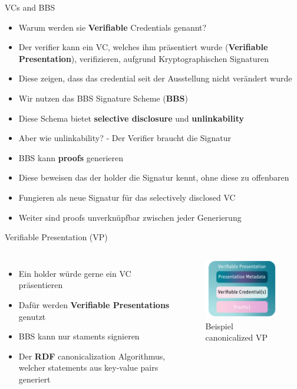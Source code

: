 \documentclass[
	ngerman,%
	authorontitle=true,
	]{bfhbeamer}
\begin{document}
\begin{frame}{VCs and BBS}
    \begin{itemize}
        \item Warum werden sie \textbf{Verifiable} Credentials genannt?
        \item Der verifier kann ein VC, welches ihm präsentiert wurde (\textbf{Verifiable Presentation}), verifizieren, aufgrund Kryptographischen Signaturen
        \item Diese zeigen, dass das credential seit der Ausstellung nicht verändert wurde
        \item Wir nutzen das BBS Signature Scheme (\textbf{BBS}) 
        \item Diese Schema bietet \textbf{selective disclosure} und \textbf{unlinkability}
        \item Aber wie unlinkability? - Der Verifier braucht die Signatur
        \item BBS kann \textbf{proofs} generieren
        \item Diese beweisen das der holder die Signatur kennt, ohne diese zu offenbaren
        \item Fungieren als neue Signatur für das selectively disclosed VC
        \item Weiter sind proofs unverknüpfbar zwischen jeder Generierung
    \end{itemize}
\end{frame}

\begin{frame}{Verifiable Presentation (VP)}
    \begin{columns}[onlytextwidth,T]
        \column{70mm}  
        \begin{itemize}
            \item Ein holder würde gerne ein VC präsentieren
            \item Dafür werden \textbf{Verifiable Presentations} genutzt
            \item BBS kann nur staments signieren
            \item Der \textbf{RDF} canonicalization Algorithmus, welcher statements aus key-value pairs generiert
        \end{itemize}

        \column{70mm}

        \begin{figure}
            \centering
            \includegraphics[width=70mm]{../img/VP.png}
            \caption{Beispiel canonicalized VP}
        \end{figure}

    \end{columns}
\end{frame}
\end{document}
